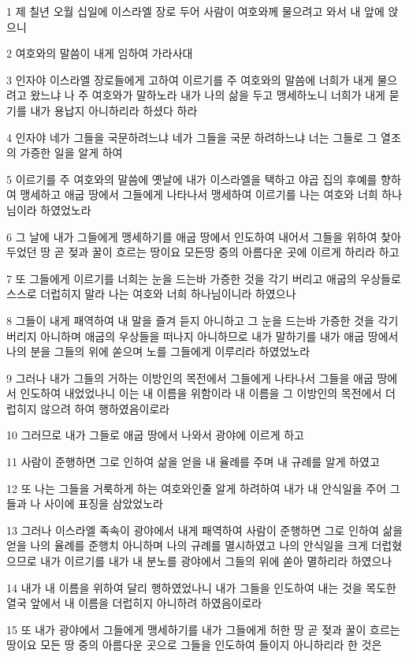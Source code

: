 \par 1 제 칠년 오월 십일에 이스라엘 장로 두어 사람이 여호와께 물으려고 와서 내 앞에 앉으니
\par 2 여호와의 말씀이 내게 임하여 가라사대
\par 3 인자야 이스라엘 장로들에게 고하여 이르기를 주 여호와의 말씀에 너희가 내게 물으려고 왔느냐 나 주 여호와가 말하노라 내가 나의 삶을 두고 맹세하노니 너희가 내게 묻기를 내가 용납지 아니하리라 하셨다 하라
\par 4 인자야 네가 그들을 국문하려느냐 네가 그들을 국문 하려하느냐 너는 그들로 그 열조의 가증한 일을 알게 하여
\par 5 이르기를 주 여호와의 말씀에 옛날에 내가 이스라엘을 택하고 야곱 집의 후예를 향하여 맹세하고 애굽 땅에서 그들에게 나타나서 맹세하여 이르기를 나는 여호와 너희 하나님이라 하였었노라
\par 6 그 날에 내가 그들에게 맹세하기를 애굽 땅에서 인도하여 내어서 그들을 위하여 찾아 두었던 땅 곧 젖과 꿀이 흐르는 땅이요 모든땅 중의 아름다운 곳에 이르게 하리라 하고
\par 7 또 그들에게 이르기를 너희는 눈을 드는바 가증한 것을 각기 버리고 애굽의 우상들로 스스로 더럽히지 말라 나는 여호와 너희 하나님이니라 하였으나
\par 8 그들이 내게 패역하여 내 말을 즐겨 듣지 아니하고 그 눈을 드는바 가증한 것을 각기 버리지 아니하며 애굽의 우상들을 떠나지 아니하므로 내가 말하기를 내가 애굽 땅에서 나의 분을 그들의 위에 쏟으며 노를 그들에게 이루리라 하였었노라
\par 9 그러나 내가 그들의 거하는 이방인의 목전에서 그들에게 나타나서 그들을 애굽 땅에서 인도하여 내었었나니 이는 내 이름을 위함이라 내 이름을 그 이방인의 목전에서 더럽히지 않으려 하여 행하였음이로라
\par 10 그러므로 내가 그들로 애굽 땅에서 나와서 광야에 이르게 하고
\par 11 사람이 준행하면 그로 인하여 삶을 얻을 내 율례를 주며 내 규례를 알게 하였고
\par 12 또 나는 그들을 거룩하게 하는 여호와인줄 알게 하려하여 내가 내 안식일을 주어 그들과 나 사이에 표징을 삼았었노라
\par 13 그러나 이스라엘 족속이 광야에서 내게 패역하여 사람이 준행하면 그로 인하여 삶을 얻을 나의 율례를 준행치 아니하며 나의 규례를 멸시하였고 나의 안식일을 크게 더럽혔으므로 내가 이르기를 내가 내 분노를 광야에서 그들의 위에 쏟아 멸하리라 하였으나
\par 14 내가 내 이름을 위하여 달리 행하였었나니 내가 그들을 인도하여 내는 것을 목도한 열국 앞에서 내 이름을 더럽히지 아니하려 하였음이로라
\par 15 또 내가 광야에서 그들에게 맹세하기를 내가 그들에게 허한 땅 곧 젖과 꿀이 흐르는 땅이요 모든 땅 중의 아름다운 곳으로 그들을 인도하여 들이지 아니하리라 한 것은
